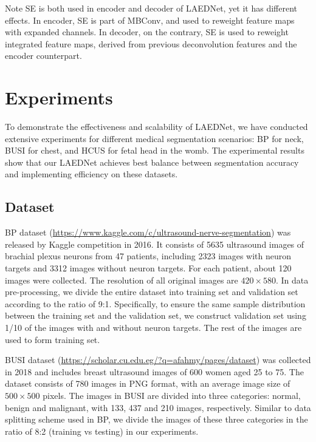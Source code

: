\documentclass[review]{elsarticle}
\begin{document}
Note SE is both used in encoder and decoder of LAEDNet, yet it has different effects. In encoder, SE is part of MBConv, and used to reweight feature maps with expanded channels. In decoder, on the contrary, SE is used to reweight integrated feature maps, derived from previous deconvolution features and the encoder counterpart.

\section{Experiments}

To demonstrate the effectiveness and scalability of LAEDNet, we have conducted extensive experiments for different medical segmentation scenarios: BP\cite{Kaggle} for neck, BUSI\cite{2019Dataset} for chest, and HCUS\cite{2018Automated} for fetal head in the womb. The experimental results show that our LAEDNet achieves best balance between segmentation accuracy and implementing efficiency on these datasets.

\subsection{Dataset}\label{dataset}

BP \cite{Kaggle} dataset (\url{https://www.kaggle.com/c/ultrasound-nerve-segmentation}) was released by Kaggle competition in 2016. It consists of 5635 ultrasound images of brachial plexus neurons from 47 patients, including 2323 images with neuron targets and 3312 images without neuron targets. For each patient, about 120 images were collected. The resolution of all original images are $420\times580$. In data pre-processing, we divide the entire dataset into training set and validation set according to the ratio of 9:1. Specifically, to ensure the same sample distribution between the training set and the validation set, we construct validation set using 1/10 of the images with and without neuron targets. The rest of the images are used to form training set.

BUSI \cite{2019Dataset} dataset (\url{https://scholar.cu.edu.eg/?q=afahmy/pages/dataset}) was collected in 2018 and includes breast ultrasound images of 600 women aged 25 to 75. The dataset consists of 780 images in PNG format, with an average image size of $500\times500$ pixels. The images in BUSI\cite{2019Dataset} are divided into three categories: normal, benign and malignant, with 133, 437 and 210 images, respectively. Similar to data splitting scheme used in BP\cite{Kaggle}, we divide the images of these three categories in the ratio of 8:2 (training vs testing) in our experiments.
\end{document}
